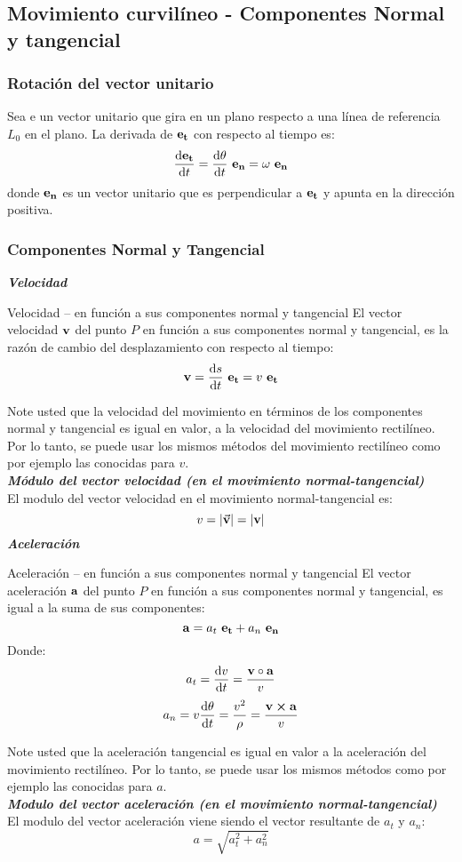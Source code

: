\subsection*{Movimiento curvilíneo - Componentes Normal y tangencial}
\subsubsection*{Rotación del vector unitario}
Sea e un vector unitario que gira en un plano respecto a una línea de referencia $L_0$ en el plano.
La derivada de $\vb{e_t}$ con respecto al tiempo es:
$$ \dv{\vb{e_t}}{t}=\dv{\theta}{t} \ \vb{e_n}=\omega \ \vb{e_n} $$
donde $\vb{e_n}$ es un vector unitario que es perpendicular a $\vb{e_t}$ y apunta en la dirección positiva.
\subsubsection*{Componentes Normal y Tangencial}
\textit{\textbf{Velocidad}}
\begin{Theorem*}{Velocidad – en función a sus componentes normal y tangencial}
	El vector velocidad $\vb{v}$ del punto $P$ en función a sus componentes normal y tangencial, es la razón de cambio del desplazamiento con respecto al tiempo:
	$$ \vb{v}=\dv{s}{t} \ \vb{e_t}=v \ \vb{e_t} $$
\end{Theorem*}
Note usted que la velocidad del movimiento en términos de los componentes normal y tangencial es igual en valor, a la velocidad del movimiento rectilíneo. Por lo tanto, se puede usar los mismos métodos del movimiento rectilíneo como por ejemplo las conocidas para $v$. \\
\textit{\textbf{Módulo del vector velocidad (en el movimiento normal-tangencial)}} \\
El modulo del vector velocidad en el movimiento normal-tangencial es:
$$ v=\left|\va{v}\right|=\left|\vb{v}\right| $$
\textit{\textbf{Aceleración}}
\begin{Theorem*}{Aceleración – en función a sus componentes normal y tangencial}
	El vector aceleración $\vb{a}$ del punto $P$ en función a sus componentes normal y tangencial, es igual a la suma de sus componentes:
	$$ \vb{a}=a_t \ \vb{e_t}+a_n \ \vb{e_n} $$
	Donde:
	$$a_t=\dv{v}{t}=\frac{\vb{v}\circ\vb{a}}{v}$$
	$$a_n=v\dv{\theta}{t}=\frac{v^2}{\rho}=\frac{\vb{v}\cross\vb{a}}{v}$$
\end{Theorem*}
Note usted que la aceleración tangencial es igual en valor a la aceleración del movimiento rectilíneo. Por lo tanto, se puede usar los mismos métodos como por ejemplo las conocidas para $a$. \\
\textit{\textbf{Modulo del vector aceleración (en el movimiento normal-tangencial)}} \\
El modulo del vector aceleración viene siendo el vector resultante de $a_t$ y $a_n$:
$$ a=\sqrt{a_t^2+a_n^2} $$
